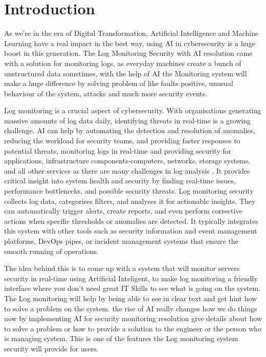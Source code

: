 \chapter{Introduction}
\label{chap:intro}

As we’re in the era of Digital Transformation, Artificial Intelligence and Machine Learning have a real impact in the best way, using AI in cybersecurity is a huge boost in this generation. The Log Monitoring Security with AI  resolution came with a solution for monitoring logs, 
as everyday machines create a bunch of unstructured data sometimes, with the help of AI the Monitoring system will make a huge difference by solving problem of like faults positive, unusual behaviour of the system, attacks and much more security events\cite{kaur2023artificial}.

Log monitoring is a crucial aspect of cybersecurity. With organisations generating massive amounts of log data daily, identifying threats in real-time is a growing challenge. AI can help by automating the detection and resolution of anomalies, reducing the workload for security teams, and providing faster responses to potential threats,  monitoring logs in real-time and providing security for applications, infrastructure components-computers, networks, storage systems, and all other services as there are many challenges in log analysis \cite{oliner2012advances}.  It provides critical insight into system health and security by finding real-time issues, performance bottlenecks, and possible security threats. Log monitoring security collects log data, categorises filters, and analyses it for actionable insights. They can automatically trigger alerts, create reports, and even perform corrective actions when specific thresholds or anomalies are detected. It typically integrates this system with other tools such as security information and event management platforms, DevOps pipes, or incident management systems that ensure the smooth running of operations\cite{pratap2022real}.

 

The idea behind this is to come up with a system that will monitor servers security in real-time using Artificial Inteligent, to make log monitoring a friendly interface where you don't need great IT Skills to see what is going on the system. The Log monitoring will help by  being able to see in clear text and  get hint how to solve a problem on the system. the rise of AI really changes how we do things now by implementing AI for security monitoring resolution give details about how to solve a problem or how to provide a solution to the engineer or the person who is managing system. This is one of the features the Log monitoring system security will provide for users. \cite{turnbull2005understanding}





